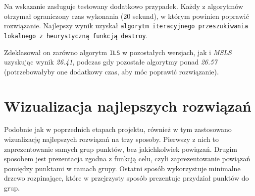\documentclass[main.tex]{subfiles}
\begin{document}
Na wskazanie zasługuje testowany dodatkowo przypadek. Każdy z algorytmów otrzymał ograniczony czas wykonania (20 sekund), w którym powinien poprawić rozwiązanie. Najlepszy wynik uzyskał \texttt{algorytm iteracyjnego przeszukiwania lokalnego z heurystyczną funkcją destroy}.

Zdeklasował on zarówno algorytm \texttt{ILS} w pozostałych wersjach, jak i \textit{MSLS} uzyskując wynik \textit{26.41}, podczas gdy pozostałe algorytmy ponad \textit{26.57} (potrzebowałyby one dodatkowy czas, aby móc poprawić rozwiązanie).

\section{Wizualizacja najlepszych rozwiązań}
Podobnie jak w poprzednich etapach projektu, również w tym zastosowano wizualizację najlepszych rozwiązań na trzy sposoby. Pierwszy z nich to zaprezentowanie samych grup punktów, bez jakichkolwiek powiązań. Drugim sposobem jest prezentacja zgodna z funkcją celu, czyli zaprezentowanie powiązań pomiędzy punktami w ramach grupy. Ostatni sposób wykorzystuje minimalne drzewo rozpinające, które w przejrzysty sposób prezentuje przydział punktów do grup.
\end{document}
